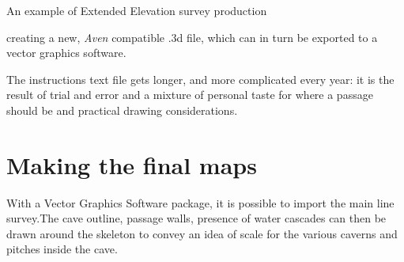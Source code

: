 \begin{marginsurvey}
\caption{An example of Extended Elevation survey production} \label{fig:example}
\end{marginsurvey}

creating a new, \emph{Aven} compatible .3d file, which can in turn be exported to a vector graphics software.

The instructions text file gets longer, and more complicated every year: it is the result of trial and error and a mixture of personal taste for where a passage should be and practical drawing considerations. 




\section{Making the final maps}
With a Vector Graphics Software package, it is possible to import the main line survey.The cave outline, passage walls, presence of water cascades can then be drawn around the skeleton to convey an idea of scale for the various caverns and pitches inside the cave.



